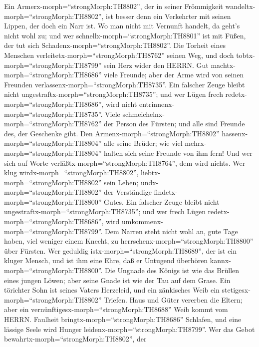  Ein Armerx-morph=``strongMorph:TH8802'', der in seiner
Frömmigkeit wandeltx-morph=``strongMorph:TH8802'', ist besser denn ein
Verkehrter mit seinen Lippen, der doch ein Narr ist.  Wo man
nicht mit Vernunft handelt, da geht's nicht wohl zu; und wer
schnellx-morph=``strongMorph:TH8801'' ist mit Füßen, der tut sich
Schadenx-morph=``strongMorph:TH8802''.  Die Torheit eines
Menschen verleitetx-morph=``strongMorph:TH8762'' seinen Weg, und doch
tobtx-morph=``strongMorph:TH8799'' sein Herz wider den HERRN.
 Gut machtx-morph=``strongMorph:TH8686'' viele Freunde; aber
der Arme wird von seinen Freunden
verlassenx-morph=``strongMorph:TH8735''.  Ein falscher Zeuge
bleibt nicht ungestraftx-morph=``strongMorph:TH8735''; und wer Lügen
frech redetx-morph=``strongMorph:TH8686'', wird nicht
entrinnenx-morph=``strongMorph:TH8735''.  Viele
schmeichelnx-morph=``strongMorph:TH8762'' der Person des Fürsten; und
alle sind Freunde des, der Geschenke gibt.  Den
Armenx-morph=``strongMorph:TH8802'' hassenx-morph=``strongMorph:TH8804''
alle seine Brüder; wie viel mehrx-morph=``strongMorph:TH8804'' halten
sich seine Freunde von ihm fern! Und wer sich auf Worte
verläßtx-morph=``strongMorph:TH8764'', dem wird nichts.  Wer
klug wirdx-morph=``strongMorph:TH8802'',
liebtx-morph=``strongMorph:TH8802'' sein Leben;
undx-morph=``strongMorph:TH8802'' der Verständige
findetx-morph=``strongMorph:TH8800'' Gutes.  Ein falscher
Zeuge bleibt nicht ungestraftx-morph=``strongMorph:TH8735''; und wer
frech Lügen redetx-morph=``strongMorph:TH8686'', wird
umkommenx-morph=``strongMorph:TH8799''.  Dem Narren steht
nicht wohl an, gute Tage haben, viel weniger einem Knecht, zu
herrschenx-morph=``strongMorph:TH8800'' über Fürsten.  Wer
geduldig istx-morph=``strongMorph:TH8689'', der ist ein kluger Mensch,
und ist ihm eine Ehre, daß er Untugend überhören
kannx-morph=``strongMorph:TH8800''.  Die Ungnade des Königs
ist wie das Brüllen eines jungen Löwen; aber seine Gnade ist wie der Tau
auf dem Grase.  Ein törichter Sohn ist seines Vaters
Herzeleid, und ein zänkisches Weib ein
stetigesx-morph=``strongMorph:TH8802'' Triefen.  Haus und
Güter vererben die Eltern; aber ein
vernünftigesx-morph=``strongMorph:TH8688'' Weib kommt vom HERRN.
 Faulheit bringtx-morph=``strongMorph:TH8686'' Schlafen,
und eine lässige Seele wird Hunger leidenx-morph=``strongMorph:TH8799''.
 Wer das Gebot bewahrtx-morph=``strongMorph:TH8802'', der
